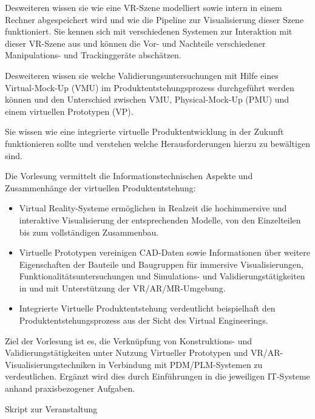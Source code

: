 \begin{course}
\begin{learningoutcomes}
 

Desweiteren wissen sie wie eine VR-Szene modelliert sowie intern in einem Rechner abgespeichert wird und wie die Pipeline zur Visualisierung dieser Szene funktioniert. Sie kennen sich mit verschiedenen Systemen zur Interaktion mit dieser VR-Szene aus und können die Vor- und Nachteile verschiedener Manipulations- und Trackinggeräte abschätzen.

 

Desweiteren wissen sie welche Validierungsuntersuchungen mit Hilfe eines Virtual-Mock-Up (VMU) im Produktentstehungsprozess durchgeführt werden können und den Unterschied zwischen VMU, Physical-Mock-Up (PMU) und einem virtuellen Prototypen (VP).

 

Sie wissen wie eine integrierte virtuelle Produktentwicklung in der Zukunft funktionieren sollte und verstehen welche Herausforderungen hierzu zu bewältigen sind.


\end{learningoutcomes}

\begin{content}
Die Vorlesung vermittelt die Informationstechnischen Aspekte und Zusammenhänge der virtuellen Produktentstehung:

 \begin{itemize}\item Virtual Reality-Systeme ermöglichen in Realzeit die hochimmersive und interaktive Visualisierung der entsprechenden Modelle, von den Einzelteilen bis zum vollständigen Zusammenbau.  \item Virtuelle Prototypen vereinigen CAD-Daten sowie Informationen über weitere Eigenschaften der Bauteile und Baugruppen für immersive Visualisierungen, Funktionalitätsuntersuchungen und Simulations- und Validierungstätigkeiten in und mit Unterstützung der VR/AR/MR-Umgebung.   \item Integrierte Virtuelle Produktentstehung verdeutlicht beispielhaft den Produktentstehungsprozess aus der Sicht des Virtual Engineerings.   \end{itemize}

Ziel der Vorlesung ist es, die Verknüpfung von Konstruktions- und Validierungstätigkeiten unter Nutzung Virtueller Prototypen und VR/AR-Visualisierungstechniken in Verbindung mit PDM/PLM-Systemen zu verdeutlichen. Ergänzt wird dies durch Einführungen in die jeweiligen IT-Systeme anhand praxisbezogener Aufgaben.


\end{content}

\begin{media}Skript zur Veranstaltung

\end{media}





\end{course}